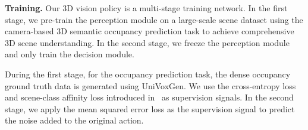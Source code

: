\textbf{Training.} Our 3D vision policy is a multi-stage training network. In the first stage, we pre-train the perception module on a large-scale scene dataset using the camera-based 3D semantic occupancy prediction task to achieve comprehensive 3D scene understanding. In the second stage, we freeze the perception module and only train the decision module.

During the first stage, for the occupancy prediction task, the dense occupancy ground truth data is generated using UniVoxGen. We use the cross-entropy loss and scene-class affinity loss introduced in~\cite{cao2022monoscene} as supervision signals. In the second stage, we apply the mean squared error loss as the supervision signal to predict the noise added to the original action.
